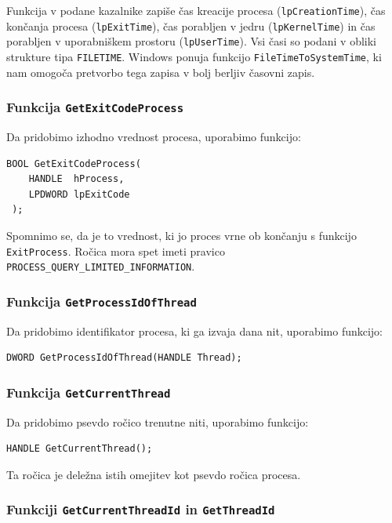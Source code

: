 \documentclass[a4paper,12pt,openright]{book}
\begin{document}
Funkcija v podane kazalnike zapiše čas kreacije procesa (\texttt{lpCreationTime}), čas končanja procesa (\texttt{lpExitTime}), čas porabljen v jedru (\texttt{lpKernelTime}) in čas porabljen v uporabniškem prostoru (\texttt{lpUserTime}).
Vsi časi so podani v obliki strukture tipa \texttt{FILETIME}.
Windows ponuja funkcijo \texttt{FileTimeToSystem\-Time}, ki nam omogoča pretvorbo tega zapisa v bolj berljiv časovni zapis.

\subsubsection{Funkcija \texttt{GetExitCodeProcess}}

Da pridobimo izhodno vrednost procesa, uporabimo funkcijo:
\begin{lstlisting}[style=func]
 BOOL GetExitCodeProcess(
	HANDLE  hProcess,
	LPDWORD lpExitCode
 );
\end{lstlisting}

Spomnimo se, da je to vrednost, ki jo proces vrne ob končanju s funkcijo \texttt{ExitProcess}.
Ročica mora spet imeti pravico \texttt{PROCESS\_QUERY\_LIMITED\-\_INFORMATION}.

\subsubsection{Funkcija \texttt{GetProcessIdOfThread}}

Da pridobimo identifikator procesa, ki ga izvaja dana nit, uporabimo funkcijo:
\begin{lstlisting}[style=func]
 DWORD GetProcessIdOfThread(HANDLE Thread);
\end{lstlisting}

\subsubsection{Funkcija \texttt{GetCurrentThread}}

Da pridobimo psevdo ročico trenutne niti, uporabimo funkcijo:
\begin{lstlisting}[style=func]
 HANDLE GetCurrentThread();
\end{lstlisting}
Ta ročica je deležna istih omejitev kot psevdo ročica procesa.

\subsubsection{Funkciji \texttt{GetCurrentThreadId} in \texttt{GetThreadId}}
\end{document}
